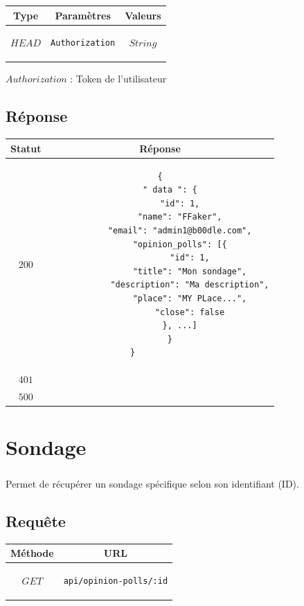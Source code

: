 \documentclass[titlepage]{report}
\begin{document}
\begin{center}
	\begin{tabular}{|c|c|c|}
		\hline
		Type & Paramètres & Valeurs 
		\\ \hline
		$ HEAD $ & 	
		\begin{lstlisting}
Authorization
		\end{lstlisting} &
		$ String $
		\\ \hline
	\end{tabular}
\end{center}

\par $ Authorization $ : Token de l'utilisateur

\section{Réponse}

\begin{center}
		\begin{tabular}{|c|c|}
			\hline
			Statut & Réponse \\
			\hline
			$ 200 $ & \begin{lstlisting}
{
	" data ": {
		"id": 1,
		"name": "FFaker",
		"email": "admin1@b00dle.com",
		"opinion_polls": [{
			"id": 1,
			"title": "Mon sondage",
			"description": "Ma description",
			"place": "MY PLace...",
			"close": false
		}, ...]
	}
}			
			\end{lstlisting} \\ 
			\hline
			$ 401 $ & \\
			\hline
			$ 500 $ & \\
			\hline
		\end{tabular}
\end{center}


\chapter{Sondage}

\paragraph{} Permet de récupérer un sondage spécifique selon son identifiant (ID).

\section{Requête}

\begin{center}
	\begin{tabular}{|c|c|}
		\hline
		Méthode & URL \\
		\hline
		$ GET $ 
		&
		\begin{lstlisting}
api/opinion-polls/:id
		\end{lstlisting} 
		\\ \hline
	\end{tabular}
\end{center}
\end{document}
